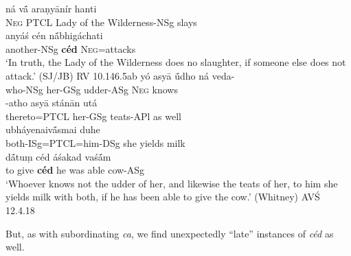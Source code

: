 \documentclass[output=paper,
modfonts
]{LSP/langsci}
\begin{document}
\begin{exe}
\ex
	\begin{xlist}
	\ex\gll ná vā́ araṇyānír hanti \\
			\textsc{Neg} PTCL {Lady of the Wilderness-NSg} slays \\
			
		\gll anyáś cén nā́bhigáchati \\
			another-NSg \textbf{céd} \textsc{Neg}=attacks \\
		\glt `In truth, the Lady of the Wilderness does no slaughter, if someone else does not attack.' (SJ/JB) \hfill {RV 10.146.5ab}
	\ex\gll yó asyā ū́dho ná veda-\\
			who-NSg her-GSg udder-ASg \textsc{Neg} knows \\
			
		\gll -atho asyā stánān utá \\
			thereto=PTCL her-GSg teats-APl {as well} \\
			
		\gll ubháyenaivā́smai duhe \\
			both-ISg=PTCL=him-DSg {she yields milk} \\
			
		\gll dā́tuṃ céd áśakad vaśā́m \\
			{to give} \textbf{céd} {he was able} cow-ASg \\
		\glt `Whoever knows not the udder of her, and likewise the teats of her, to him she yields milk with both, if he has been able to give the cow.' (Whitney) \hfill {AVŚ 12.4.18} \\
	\end{xlist}
\end{exe}

But, as with subordinating \textit{ca}, we find unexpectedly ``late'' instances of \textit{céd} as well.

\end{document}
